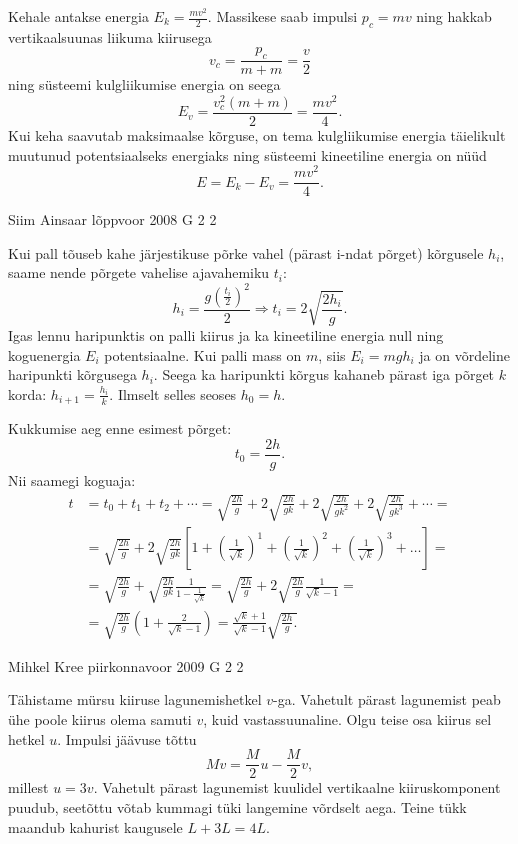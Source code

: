 \documentclass[11pt]{article}
\begin{document}
{{\ifSolution
Kehale antakse energia $E_k = \frac{mv^2}{2}$. Massikese saab impulsi $p_c = mv$ ning hakkab vertikaalsuunas liikuma kiirusega
\[
v_{c}=\frac{p_{c}}{m+m}=\frac{v}{2}
\]
ning süsteemi kulgliikumise energia on seega
\[
E_{v}=\frac{v_{c}^{2}(m+m)}{2}=\frac{m v^{2}}{4}.
\]
Kui keha saavutab maksimaalse kõrguse, on tema kulgliikumise energia täielikult muutunud potentsiaalseks energiaks ning süsteemi kineetiline energia on nüüd
\[
E = E_k - E_v = \frac{mv^2}{4}.
\]
\fi
}

{Siim Ainsaar} %
{lõppvoor} %
{2008} %
{G 2} %
{2} %
{

\ifSolution
Kui pall tõuseb kahe järjestikuse põrke vahel (pärast i-ndat põrget) kõrgusele $h_i$, saame nende põrgete vahelise ajavahemiku $t_i$:
\[
h_{i}=\frac{g\left(\frac{t_{i}}{2}\right)^{2}}{2} \Longrightarrow t_{i}=2 \sqrt{\frac{2 h_{i}}{g}}.
\]
Igas lennu haripunktis on palli kiirus ja ka kineetiline energia null ning koguenergia $E_i$ potentsiaalne. Kui palli mass on $m$, siis $E_i = mgh_i$ ja on võrdeline haripunkti kõrgusega $h_i$. Seega ka haripunkti kõrgus kahaneb pärast iga põrget $k$ korda: $h_{i+1} = \frac{h_i}{k}$. Ilmselt selles seoses $h_0 = h$.

Kukkumise aeg enne esimest põrget:
\[
t_0 = \frac{2h}{g}.
\]
Nii saamegi koguaja:
\[
\begin{aligned} 
	t &=t_{0}+t_{1}+t_{2}+\cdots=\sqrt{\frac{2 h}{g}}+2 \sqrt{\frac{2 h}{g k}} + 2 \sqrt{\frac{2 h}{g k^{2}}}+2 \sqrt{\frac{2 h}{g k^{3}}}+\cdots=\\ &=\sqrt{\frac{2 h}{g}}+2 \sqrt{\frac{2 h}{g k}}\left[1+\left(\frac{1}{\sqrt{k}}\right)^{1}+\left(\frac{1}{\sqrt{k}}\right)^{2}+\left(\frac{1}{\sqrt{k}}\right)^{3}+\ldots\right]=\\ &=\sqrt{\frac{2 h}{g}}+\sqrt{\frac{2 h}{g k}} \frac{1}{1-\frac{1}{\sqrt{k}}}=\sqrt{\frac{2 h}{g}}+2 \sqrt{\frac{2 h}{g}} \frac{1}{\sqrt{k}-1}=\\ &=\sqrt{\frac{2 h}{g}}\left(1+\frac{2}{\sqrt{k}-1}\right)=\frac{\sqrt{k}+1}{\sqrt{k}-1} \sqrt{\frac{2 h}{g}.} 
\end{aligned}
\]
\fi
}

{Mihkel Kree} %
{piirkonnavoor} %
{2009} %
{G 2} %
{2} %
{

\ifSolution
Tähistame mürsu kiiruse lagunemishetkel $v$-ga. Vahetult pärast lagunemist peab ühe poole kiirus olema samuti $v$, kuid vastassuunaline. Olgu teise osa kiirus sel hetkel $u$. Impulsi jäävuse tõttu
\[
Mv = \frac{M}{2}u - \frac{M}{2}v,
\]
millest $u=3v$. Vahetult pärast lagunemist kuulidel vertikaalne kiiruskomponent puudub, seetõttu võtab kummagi tüki langemine võrdselt aega. Teine
tükk maandub kahurist kaugusele $L + 3L = 4L$.
\fi
}

}
\end{document}

